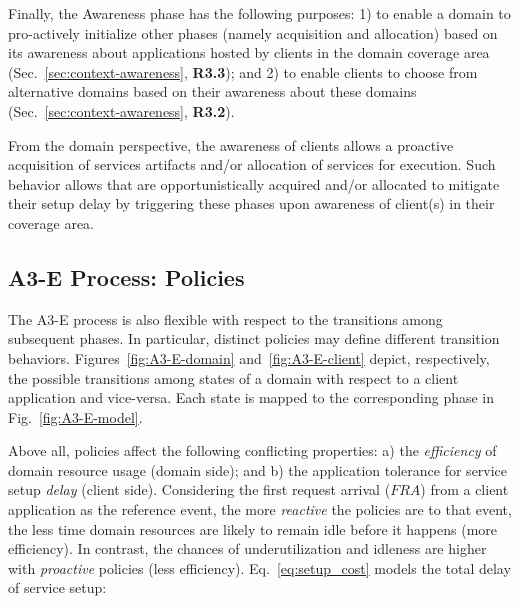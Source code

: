 Finally, the Awareness phase has the following purposes: 1) to enable a domain to pro-actively initialize other phases (namely acquisition and allocation) based on its awareness about applications hosted by clients in the domain coverage area (Sec.~\ref{sec:context-awareness}, \textbf{R3.3}); and 2) to enable clients to choose from alternative domains based on their awareness about these domains (Sec.~\ref{sec:context-awareness}, \textbf{R3.2}).

From the domain perspective, the awareness of clients allows a proactive acquisition of services artifacts and/or allocation of services for execution. Such behavior allows that are opportunistically acquired and/or allocated to mitigate their setup delay by triggering these phases upon awareness of client(s) in their coverage area.



\subsection{A3-E Process: Policies}\label{sec:A3-E-policies}


The A3-E process is also flexible with respect to the transitions among subsequent phases. In particular, distinct policies may define different transition behaviors. Figures~\ref{fig:A3-E-domain} and~\ref{fig:A3-E-client} depict, respectively, the possible transitions among states of a domain with respect to a client application and vice-versa. Each state is mapped to the corresponding phase in Fig.~\ref{fig:A3-E-model}. 

Above all, policies affect the following conflicting properties: a) the \textit{efficiency} of domain resource usage (domain side); and b) the application tolerance for service setup \textit{delay} (client side). Considering the first request arrival ($FRA$) from a client application as the reference event, the more \textit{reactive} the policies are to that event, the less time domain resources are likely to remain idle before it happens (more efficiency). In contrast, the chances of underutilization and idleness are higher with \textit{proactive} policies (less efficiency). Eq.~\ref{eq:setup_cost} models the total delay of service setup:

